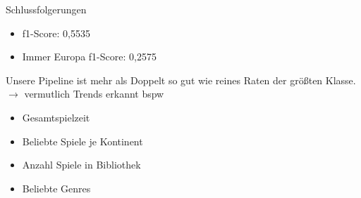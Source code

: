 \documentclass[12pt]{beamer}
\begin{document}
\begin{frame}[fragile]{Schlussfolgerungen}
	\begin{itemize}
		\item f1-Score: 0,5535
		\item Immer Europa f1-Score: 0,2575
	\end{itemize}
	Unsere Pipeline ist mehr als Doppelt so gut wie reines Raten der größten Klasse. \\
	$ \rightarrow $ vermutlich Trends erkannt bspw
	\begin{itemize}
		\item Gesamtspielzeit
		\item Beliebte Spiele je Kontinent
		\item Anzahl Spiele in Bibliothek
		\item Beliebte Genres
	\end{itemize}  
\end{frame}
\end{document}
